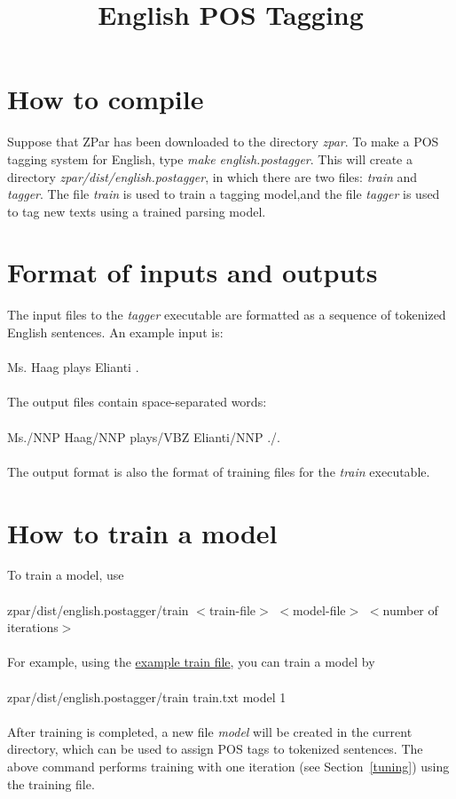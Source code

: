 \documentclass[12pt]{article}
\title{English POS Tagging}
\begin{document}
\begin{CJK}{GBK}{song}
\maketitle

\section{How to compile}
Suppose that ZPar has been downloaded to the directory \textit{zpar}. To make a POS tagging system for English, type \textit{make english.postagger}. This will create a directory \textit{zpar/dist/english.postagger}, in which there are two files: \textit{train} and \textit{tagger}. The file \textit{train} is used to train a tagging model,and the file \textit{tagger} is used to tag new texts using a trained parsing model.
\section{Format of inputs and outputs}
The input files to the \textit{tagger} executable are formatted as a sequence of tokenized English sentences. An example input is:
\\
\\
\hspace{3cm} Ms. Haag plays Elianti .
\\
\\
The output files contain space-separated words:
\\
\\
\hspace{3cm} Ms./NNP Haag/NNP plays/VBZ Elianti/NNP ./.
\\
\\
The output format is also the format of training files for the \textit{train} executable.
\section{How to train a model}
To train a model, use
\\
\\
\hspace{3cm} zpar/dist/english.postagger/train $<$train-file$>$ $<$model-file$>$ $<$number of iterations$>$ \\
\\
For example, using the \href{eng_pos_files/train.txt}{example train file}, you can train a model by
\\
\\
\hspace{3cm} zpar/dist/english.postagger/train train.txt model 1 \\
\\
After training is completed, a new file \textit{model} will be created in the current directory, which can be used to assign POS tags to tokenized sentences. The above command performs training with one iteration (see Section~\ref{tuning}) using the training file.

\end{CJK}
\end{document}
